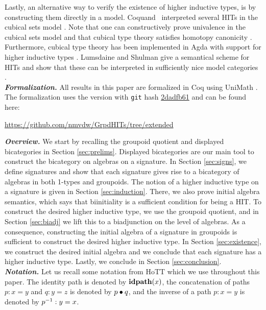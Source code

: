 Lastly, an alternative way to verify the existence of higher inductive types,
is by constructing them directly in a model.
Coquand \etal \ interpreted several HITs in the cubical sets model \cite{BezemCH13,CoquandHM18}.
Note that one can constructively prove univalence in the cubical sets model \cite{CohenCHM16}
and that cubical type theory satisfies homotopy canonicity \cite{DBLP:conf/rta/CoquandHS19}.
Furthermore, cubical type theory has been implemented in Agda with support for higher inductive types \cite{vezzosi2019cubical}.
Lumsdaine and Shulman give a semantical scheme for HITs and show that these can be interpreted
in sufficiently nice model categories \cite{lumsdaine2017semantics}.
\\
\emph{\textbf{Formalization.}}
All results in this paper are formalized in Coq \cite{Coq:manual} using UniMath \cite{UniMath}.
The formalization uses the version with \texttt{git} hash \href{https://github.com/UniMath/UniMath/tree/2dadfb61f5ef0d9805cf0eb6b80ef2beb26472d5}{2dadfb61} and can be found here:
\begin{center}
\url{https://github.com/nmvdw/GrpdHITs/tree/extended}
\end{center}
\emph{\textbf{Overview.}}
We start by recalling the groupoid quotient and displayed bicategories in Section \ref{sec:prelims}.
Displayed bicategories are our main tool to construct the bicategory on algebras on a signature.
In Section \ref{sec:signs}, we define signatures and show that each signature gives rise to a bicategory of algebras in both 1-types and groupoids.
The notion of a higher inductive type on a signature is given in Section \ref{sec:induction}.
There, we also prove initial algebra semantics, which says that biinitiality is a sufficient condition for being a HIT.
To construct the desired higher inductive type, we use the groupoid quotient, and in Section \ref{sec:biadj} we lift this to a biadjunction on the level of algebras.
As a consequence, constructing the initial algebra of a signature in groupoids is sufficient to construct the desired higher inductive type.
In Section \ref{sec:existence}, we construct the desired initial algebra and we conclude that each signature has a higher inductive type. 
Lastly, we conclude in Section \ref{sec:conclusion}.
\\
\emph{\textbf{Notation.}}
Let us recall some notation from HoTT which we use throughout this paper.
The identity path is denoted by $\operatorname{\mathbf{idpath}}(x)$, the concatenation of paths $p : x = y$ and $q : y = z$ is denoted by $p \bullet q$, and the inverse of a path $p : x = y$ is denoted by $p^{-1} : y = x$.
